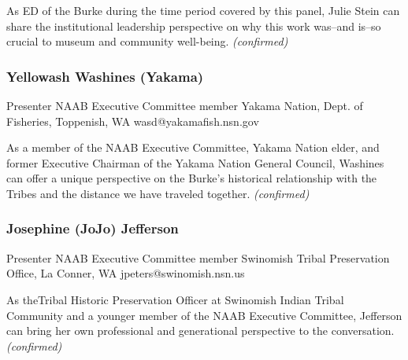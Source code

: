 \documentclass{report}
\begin{document}
                

                As ED of the Burke during the time period covered by this panel, Julie Stein can share the institutional leadership perspective on why this work was--and is--so crucial to museum and community well-being.
                \emph{ (confirmed) }
              

              
                \subsubsection*{ Yellowash Washines (Yakama) }
                Presenter\newline
                NAAB Executive Committee member\newline
                Yakama Nation, Dept. of Fisheries, Toppenish, WA
                \newline
                wasd@yakamafish.nsn.gov\newline
                
                

                As a member of the NAAB Executive Committee, Yakama Nation elder,  and former Executive Chairman of the Yakama Nation General Council, Washines can offer a unique perspective on the Burke’s historical relationship with the Tribes and the distance we have traveled together.
                \emph{ (confirmed) }
              

              
                \subsubsection*{ Josephine (JoJo) Jefferson }
                Presenter\newline
                NAAB Executive Committee member\newline
                Swinomish Tribal Preservation Office, La Conner, WA
                \newline
                jpeters@swinomish.nsn.us\newline
                
                

                As theTribal Historic Preservation Officer at Swinomish Indian Tribal Community and a younger member of the NAAB Executive Committee, Jefferson can bring her own professional and generational perspective to the conversation.
                \emph{ (confirmed) }
              
\end{document}
